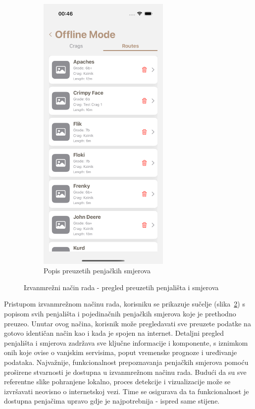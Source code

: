 \begin{figure}[H]
\begin{subfigure}[b]{0.4\textwidth}
        \includegraphics[width=0.7\textwidth]{images/implementacija/offline-mode/routes-tab.png}
        \caption{Popis preuzetih penjačkih smjerova}
        \label{fig:offline_routes_tab}
    \end{subfigure}
    \caption{Izvanmrežni način rada - pregled preuzetih penjališta i smjerova}
    \label{fig:izvanmrezni_nacin_rada}
\end{figure}

Pristupom izvanmrežnom načinu rada, korisniku se prikazuje sučelje (slika~\ref{fig:izvanmrezni_nacin_rada}) s popisom svih penjališta i pojedinačnih penjačkih smjerova koje je prethodno preuzeo. Unutar ovog načina, korisnik može pregledavati sve preuzete podatke na gotovo identičan način kao i kada je spojen na internet. Detaljni pregled penjališta i smjerova zadržava sve ključne informacije i komponente, s iznimkom onih koje ovise o vanjskim servisima, poput vremenske prognoze i uređivanje podataka.
Najvažnije, funkcionalnost prepoznavanja penjačkih smjerova pomoću proširene stvarnosti je dostupna u izvanmrežnom načinu rada. Budući da su sve referentne slike pohranjene lokalno, proces detekcije i vizualizacije može se izvršavati neovisno o internetskoj vezi. Time se osigurava da ta funkcionalnost je dostupna penjačima upravo gdje je najpotrebnija - ispred same stijene.
